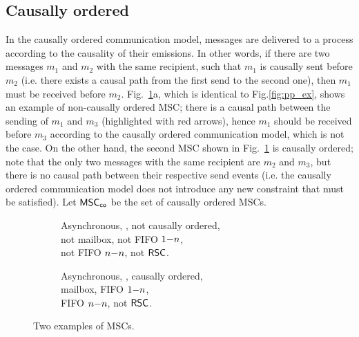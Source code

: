 \subsection{Causally ordered}
In the causally ordered communication model, messages are delivered to a process according to the causality of their emissions. In other words, if there are two messages $m_1$ and $m_2$ with the same recipient, such that $m_1$ is causally sent before $m_2$ (i.e. there exists a causal path from the first send to the second one), then $m_1$ must be received before $m_2$. Fig.~\ref{fig:co_ex}a, which is identical to Fig.\ref{fig:pp_ex}, shows an example of non-causally ordered MSC; there is a causal path between the sending of $m_1$ and $m_3$ (highlighted with red arrows), hence $m_1$ should be received before $m_3$ according to the causally ordered communication model, which is not the case. On the other hand, the second MSC shown in Fig.~\ref{fig:co_ex} is causally ordered; note that the only two messages with the same recipient are $m_2$ and $m_3$, but there is no causal path between their respective send events (i.e. the causally ordered communication model does not introduce any new constraint that must be satisfied). Let $\mathsf{MSC}_{\mathsf{co}}$ be the set of causally ordered MSCs.

\begin{figure}[h]
	\captionsetup[subfigure]{justification=centering}
	\begin{subfigure}[t]{0.45\textwidth}\centering
		\caption{Asynchronous, \pp, not causally ordered, \\not mailbox, not FIFO $1\mathsf{-}n$, \\not FIFO $n\mathsf{-}n$, not $\mathsf{RSC}$.}
	\end{subfigure}
	\begin{subfigure}[t]{0.45\textwidth}\centering
		\caption{Asynchronous, \pp, causally ordered, \\mailbox, FIFO $1\mathsf{-}n$, \\FIFO $n\mathsf{-}n$, not $\mathsf{RSC}$.}
	\end{subfigure}
		\caption{Two examples of MSCs.}
	    \label{fig:co_ex}
\end{figure}

